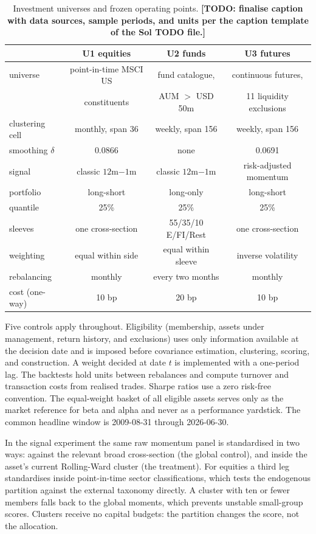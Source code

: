 \documentclass[11pt]{article}
\theoremstyle{remark}
\newcommand{\TODO}[1]{\textbf{[TODO: #1]}}
\begin{document}
\begin{table}[htbp]
\centering
\caption{Investment universes and frozen operating points.
\TODO{finalise caption with data sources, sample periods, and units per the
caption template of the Sol TODO file.}}
\label{tab:universes}
\small
\begin{tabular}{lccc}
\toprule
 & U1 equities & U2 funds & U3 futures \\
\midrule
universe & point-in-time MSCI US & fund catalogue, & continuous futures, \\
 & constituents & AUM $>$ USD 50m & 11 liquidity exclusions \\
clustering cell & monthly, span 36 & weekly, span 156 & weekly, span 156 \\
smoothing $\delta$ & 0.0866 & none & 0.0691 \\
signal & classic $12$m$-1$m & classic $12$m$-1$m & risk-adjusted momentum \\
portfolio & long-short & long-only & long-short \\
quantile & 25\% & 25\% & 25\% \\
sleeves & one cross-section & 55/35/10 E/FI/Rest & one cross-section \\
weighting & equal within side & equal within sleeve & inverse volatility \\
rebalancing & monthly & every two months & monthly \\
cost (one-way) & 10 bp & 20 bp & 10 bp \\
\bottomrule
\end{tabular}
\end{table}

Five controls apply throughout. Eligibility (membership, assets under
management, return history, and exclusions) uses only information available at
the decision date and is imposed before covariance estimation, clustering,
scoring, and construction. A weight decided at date $t$ is implemented with a
one-period lag. The backtests hold units between rebalances and compute
turnover and transaction costs from realised trades. Sharpe ratios use a zero
risk-free convention. The equal-weight basket of all eligible assets serves
only as the market reference for beta and alpha and never as a performance
yardstick. The common headline window is 2009-08-31 through 2026-06-30.

In the signal experiment the same raw momentum panel
\citep{jegadeesh1993returns} is standardised in two ways: against the relevant
broad cross-section (the global control), and inside the asset's current
Rolling-Ward cluster (the treatment). For equities
a third leg standardises inside point-in-time sector classifications, which
tests the endogenous partition against the external taxonomy directly. A
cluster with ten or fewer members falls back to the global moments, which
prevents unstable small-group scores. Clusters receive no capital budgets: the
partition changes the score, not the allocation.
\end{document}
